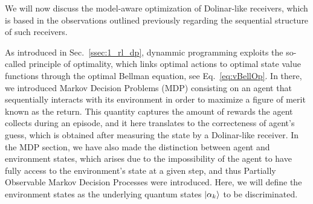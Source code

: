 We will now discuss the model-aware optimization of Dolinar-like receivers, which is based in the observations outlined previously regarding the sequential structure of such receivers.

As introduced in Sec.~\ref{ssec:1_rl_dp}, dynammic programming exploits the so-called principle of optimality, which links optimal actions to optimal state value functions through the optimal Bellman equation, see Eq.~\ref{eq:vBellOp}. In there, we introduced Markov Decision Problems (MDP) consisting on an agent that sequentially interacts with its environment in order to maximize a figure of merit known as the return. This quantity captures the amount of rewards the agent collects during an episode, and it here translates to the correcteness of agent's guess, which is obtained after measuring the state by a Dolinar-like receiver. In the MDP section, we have also made the distinction between agent and environment states, which arises due to the impossibility of the agent to have fully access to the environment's state at a given step, and thus Partially Observable Markov Decision Processes were introduced. Here, we will define the environment states as the underlying quantum states $\ket{\alpha_k}$ to be discriminated.

